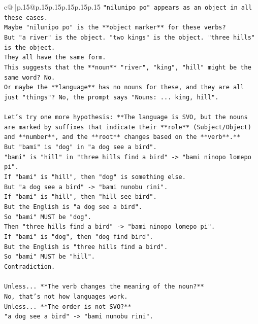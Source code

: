 \documentclass{article}
\begin{document}
{\begin{supertabular}{c@{$\;$}|p{.15\linewidth}@{}p{.15\linewidth}p{.15\linewidth}p{.15\linewidth}p{.15\linewidth}p{.15\linewidth}}
{{{\texttt{"nilunipo po" appears as an object in all these cases.} \\
\texttt{Maybe "nilunipo po" is the **object marker** for these verbs?} \\
\texttt{But "a river" is the object. "two kings" is the object. "three hills" is the object.} \\
\texttt{They all have the same form.} \\
\texttt{This suggests that the **noun** "river", "king", "hill" might be the same word? No.} \\
\texttt{Or maybe the **language** has no nouns for these, and they are all just "things"? No, the prompt says "Nouns: ... king, hill".} \\
\\ 
\texttt{Let's try one more hypothesis: **The language is SVO, but the nouns are marked by suffixes that indicate their **role** (Subject/Object) and **number**, and the **root** changes based on the **verb**.**} \\
\texttt{But "bami" is "dog" in "a dog see a bird".} \\
\texttt{"bami" is "hill" in "three hills find a bird" {-}> "bami ninopo lomepo pi".} \\
\texttt{If "bami" is "hill", then "dog" is something else.} \\
\texttt{But "a dog see a bird" {-}> "bami nunobu rini".} \\
\texttt{If "bami" is "hill", then "hill see bird".} \\
\texttt{But the English is "a dog see a bird".} \\
\texttt{So "bami" MUST be "dog".} \\
\texttt{Then "three hills find a bird" {-}> "bami ninopo lomepo pi".} \\
\texttt{If "bami" is "dog", then "dog find bird".} \\
\texttt{But the English is "three hills find a bird".} \\
\texttt{So "bami" MUST be "hill".} \\
\texttt{Contradiction.} \\
\\ 
\texttt{Unless... **The verb changes the meaning of the noun?**} \\
\texttt{No, that's not how languages work.} \\
\texttt{Unless... **The order is not SVO?**} \\
\texttt{"a dog see a bird" {-}> "bami nunobu rini".} \\
}}}
\end{supertabular}}
\end{document}
